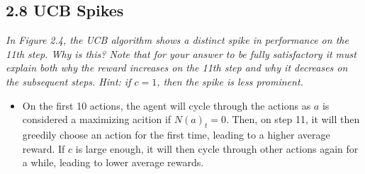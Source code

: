 \documentclass{article}
\begin{document}
\subsection{2.8 UCB Spikes}
\textit{In Figure 2.4, the UCB algorithm shows a distinct spike in performance on the 11th step. Why is this? Note that for your answer to be fully satisfactory it must explain both why the reward increases on the 11th step and why it decreases on the subsequent steps. Hint: if $c=1$, then the spike is less prominent.}
\begin{itemize}
\item On the first 10 actions, the agent will cycle through the actions as $a$ is considered a maximizing acition if $N(a)_t = 0$. Then, on step 11, it will then greedily choose an action for the first time, leading to a higher average reward. If $c$ is large enough, it will then cycle through other actions again for a while, leading to lower average rewards.
\end{itemize}
\end{document}
